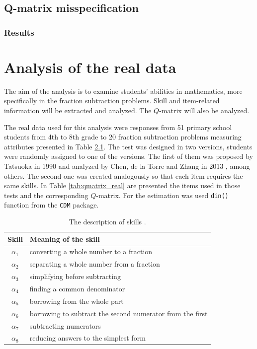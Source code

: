 \documentclass[english]{pwr_wmat_praca_dyplomowa}
\theoremstyle{plain}
\theoremstyle{definition}
\numberwithin{theorem}{chapter}
\begin{document}
\section{Q-matrix misspecification}\label{section:qmat_misspec}

\subsection{Results}

\chapter{Analysis of the real data}\label{chapter:real_data}

The aim of the analysis is to examine students' abilities in mathematics, more specifically in the fraction subtraction problems. Skill and item-related information will be extracted and analyzed. The $Q$-matrix will also be analyzed. 

The real data used for this analysis were responses from 51 primary school students from 4th to 8th grade to 20 fraction subtraction problems measuring attributes presented in Table \ref{tab:real_skills}. The test was designed in two versions, students were randomly assigned to one of the versions. The first of them was proposed by Tatsuoka in 1990 \cite{tatsuoka} and analyzed by Chen, de la Torre and Zhang in 2013 \cite{cdm_and_qmat_misspec}, among others. The second one was created analogously so that each item requires the same skills. In Table \ref{tab:qmatrix_real} are presented the items used in those tests and the corresponding $Q$-matrix. For the estimation was used \texttt{din()} function from the \texttt{CDM} package. 

\begin{table}[H]
	\centering
	\begin{tabular}{c l} 
		\hline
		{\rule{0pt}{3ex}}Skill & Meaning of the skill \\
		\hline
		{\rule{0pt}{3ex}}$\alpha_1$ & converting a whole number to a fraction \\
		$\alpha_2$ & separating a whole number from a fraction \\
		$\alpha_3$ & simplifying before subtracting \\
		$\alpha_4$ & finding a common denominator \\
		$\alpha_5$ & borrowing from the whole part \\
		$\alpha_6$ & borrowing to subtract the second numerator from the first \\
		$\alpha_7$ & subtracting numerators \\
		$\alpha_8$ & reducing answers to the simplest form \\ [0.7ex] 
		\hline
	\end{tabular}
	\caption{The description of skills \cite{fraction_subtraction}.}
	\label{tab:real_skills} 
\end{table}
\end{document}
